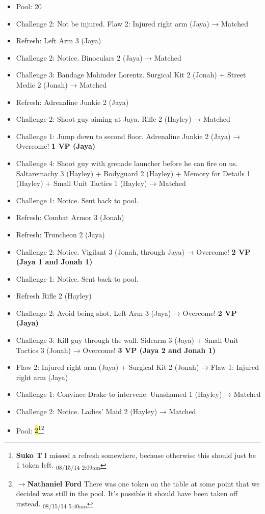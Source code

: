 \begin{itemize}
\item Pool: 20
\item Challenge 2: Not be injured.  Flaw 2: Injured right arm (Jaya) → Matched
\item Refresh: Left Arm 3 (Jaya)
\item Challenge 2: Notice.  Binoculars 2 (Jaya) → Matched
\item Challenge 3: Bandage Mohinder Lorentz.  Surgical Kit 2 (Jonah) + Street Medic 2 (Jonah) → Matched
\item Refresh: Adrenaline Junkie 2 (Jaya)
\item Challenge 2: Shoot guy aiming at Jaya. Rifle 2 (Hayley) → Matched
\item Challenge 1: Jump down to second floor.  Adrenaline Junkie 2 (Jaya)  → Overcome! \textbf{1 VP (Jaya)}
\item Challenge 4: Shoot guy with grenade launcher before he can fire on us.  Saltaremachy 3 (Hayley) + Bodyguard 2 (Hayley) + Memory for Details 1 (Hayley) + Small Unit Tactics 1 (Hayley) → Matched
\item Challenge 1: Notice. Sent back to pool.
\item Refresh: Combat Armor 3 (Jonah)
\item Refresh: Truncheon 2 (Jaya)
\item Challenge 2: Notice.  Vigilant 3 (Jonah, through Jaya) → Overcome! \textbf{2 VP (Jaya 1 and Jonah 1)}
\item Challenge 1: Notice.  Sent back to pool.
\item Refresh Rifle 2 (Hayley)
\item Challenge 2:  Avoid being shot.  Left Arm 3 (Jaya) → Overcome! \textbf{2 VP (Jaya)}
\item Challenge 3: Kill guy through the wall.  Sidearm 3 (Jaya) + Small Unit Tactics 3 (Jonah)  → Overcome! \textbf{3 VP (Jaya 2 and Jonah 1)}
\item Flaw 2: Injured right arm (Jaya) + Surgical Kit 2 (Jonah) →  {\color[RGB]{255,0,0}Flaw 1: Injured right arm (Jaya)} 
\item Challenge 1: Convince Drake to intervene.  Unashamed 1 (Hayley) → Matched
\item Challenge 2: Notice.  Ladies' Maid 2 (Hayley) → Matched
\item Pool: \hl{2}\footnote{\textbf{Suko T }I missed a refresh somewhere, because otherwise this should just be 1 token left. \textsubscript{08/15/14 2:09am}}\footnote{$\rightarrow$\textbf{Nathaniel Ford }There was one token on the table at some point that we decided was still in the pool. It's possible it should have been taken off instead. \textsubscript{08/15/14 5:40am}}
\end{itemize}


